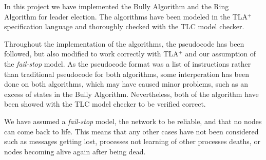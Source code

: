 \documentclass{report}
\begin{document}
In this project we have implemented the Bully Algorithm and the Ring Algorithm for leader election. The algorithms have been modeled in the  TLA$^{+}$ specification language and thoroughly checked with the TLC model checker.

Throughout the implementation of the algorithms, the pseudocode has been followed, but also modified to work correctly with TLA$^{+}$ and our assumption of the \textit{fail-stop} model. As the pseudocode format was a list of instructions rather than traditional pseudocode for both algorithms, some interperation has been done on both algorithms, which may have caused minor problems, such as an excess of states in the Bully Algorithm. Nevertheless, both of the algorithm have been showed with the TLC model checker to be verified correct.

We have assumed a \textit{fail-stop} model, the network to be reliable, and that no nodes can come back to life. This means that any other cases have not been considered such as messages getting lost, processes not learning of other processes deaths, or nodes becoming alive again after being dead.



\appendix
\end{document}
